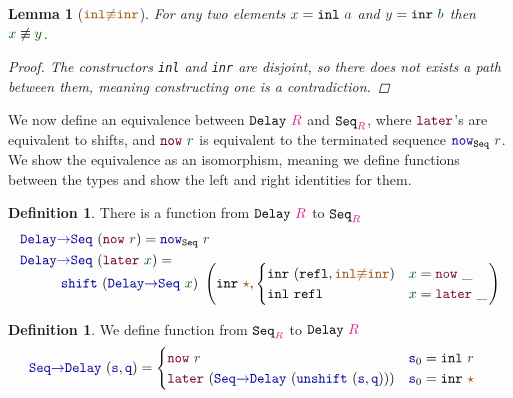 \documentclass[twoside,11pt,openright]{report}
\theoremstyle{plain} %
\newtheorem{lem}[thm]{Lemma}
\theoremstyle{definition}
\newtheorem{defn}[thm]{Definition}%
\theoremstyle{remark}
\newcommand*{\term}[1]{\textcolor{green!30!black}{#1}} %
\newcommand*{\type}[1]{\textcolor{magenta!90!black}{#1}}
\newcommand*{\constant}[1]{\textcolor{orange!60!black}{\ensuremath{\mathtt{#1}}}}
\newcommand*{\function}[1]{\textcolor{blue!60!black}{\ensuremath{\mathtt{#1}}}}
\newcommand*{\constructor}[1]{\textcolor{purple!60!black}{\ensuremath{\mathtt{#1}}}}
\newcommand*{\typeformer}[1]{\ensuremath{\mathtt{#1}}}
\newcommand*{\unitelem}{\constant{\star}} %
\begin{document}
\begin{lem}[\(\constant{inl{\not\equiv}inr}\)]
  For any two elements \(\term{x} = \mathtt{inl}~\term{a}\) and \(\term{y} = \mathtt{inr}~\term{b}\) then \(\term{x} \not\equiv \term{y}\).
  \begin{proof}
    The constructors \texttt{inl} and \texttt{inr} are disjoint, so there does not exists a path between them, meaning constructing one is a contradiction.
  \end{proof}
\end{lem}
\noindent We now define an equivalence between \(\typeformer{Delay}~\type{R}\) and \(\typeformer{Seq}_{\type{R}}\), where \(\constructor{later}\)'s are equivalent to shifts, and \(\constructor{now}~\term{r}\) is equivalent to the terminated sequence \(\function{now}_{\typeformer{Seq}}~\term{r}\). We show the equivalence as an isomorphism, meaning we define functions between the types and show the left and right identities for them.
\begin{defn}
  There is a function from \(\typeformer{Delay}~\type{R}\) to \(\typeformer{Seq}_{\type{R}}\)
  \begin{equation}
    \begin{aligned}
      \function{Delay{\rightarrow}Seq}&~(\constructor{now}~\term{r}) = \function{now}_{\typeformer{Seq}}~\term{r} \\
      \function{Delay{\rightarrow}Seq}&~(\constructor{later}~\term{x}) = \\[-3mm]
      & \strut\hspace{-8mm}\function{shift}~(\function{Delay{\rightarrow}Seq}~\term{x})~\left(\mathtt{inr}~\unitelem , \begin{cases} \mathtt{inr}~(\mathtt{refl} , \constant{inl{\not\equiv}inr}) & \term{x} = \constructor{now}~\_ \\ \mathtt{inl}~\mathtt{refl} & \term{x} = \constructor{later}~\_ \end{cases}\right)
    \end{aligned}
  \end{equation}
\end{defn}
\begin{defn}
  We define function from \(\typeformer{Seq}_{\type{R}}\) to \(\typeformer{Delay}~\type{R}\)
    \begin{equation}
      \begin{aligned}
        \function{Seq{\rightarrow}Delay}&~(\function{s} , \function{q}) = \begin{cases} \constructor{now}~\term{r} & \function{s}_0 = \mathtt{inl}~\term{r} \\ \constructor{later}~(\function{Seq{\rightarrow}Delay}~(\function{unshift}~(\function{s} , \function{q}))) & \function{s}_0 = \mathtt{inr}~\unitelem \end{cases}
      \end{aligned}
    \end{equation}
\end{defn}
\end{document}
